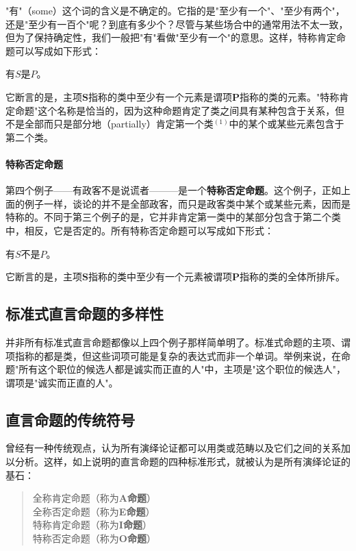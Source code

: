 "有"（some）这个词的含义是不确定的。它指的是"至少有一个"、"至少有两个"，还是"至少有一百个"呢？到底有多少个？尽管与某些场合中的通常用法不太一致，但为了保持确定性，我们一般把"有"看做"至少有一个"的意思。这样，特称肯定命题可以写成如下形式：

有$S$是$P$。

它断言的是，主项$\boldsymbol{S}$指称的类中至少有一个元素是谓项$\boldsymbol{P}$指称的类的元素。"特称肯定命题"这个名称是恰当的，因为这种命题肯定了类之间具有某种包含于关系，但不是全部而只是部分地（partially）肯定第一个类${ }^{(1)}$中的某个或某些元素包含于第二个类。

\paragraph{特称否定命题}
第四个例子——有政客不是说谎者———是一个\textbf{特称否定命题}。这个例子，正如上面的例子一样，谈论的并不是全部政客，而只是政客类中某个或某些元素，因而是特称的。不同于第三个例子的是，它并非肯定第一类中的某部分包含于第二个类中，相反，它是否定的。所有特称否定命题可以写成如下形式：

有$S$不是$P$。

它断言的是，主项$\boldsymbol{S}$指称的类中至少有一个元素被谓项$\boldsymbol{P}$指称的类的全体所排斥。

\subsection{标准式直言命题的多样性}

并非所有标准式直言命题都像以上四个例子那样简单明了。标准式命题的主项、谓项指称的都是类，但这些词项可能是复杂的表达式而非一个单词。举例来说，在命题"所有这个职位的候选人都是诚实而正直的人"中，主项是"这个职位的候选人"，谓项是"诚实而正直的人"。

\subsection{直言命题的传统符号}

曾经有一种传统观点，认为所有演绎论证都可以用类或范畴以及它们之间的关系加以分析。这样，如上说明的直言命题的四种标准形式，就被认为是所有演绎论证的基石：

\begin{quote}
全称肯定命题（称为\textbf{A命题}）\\
全称否定命题（称为\textbf{E命题}）\\
特称肯定命题（称为\textbf{I命题}）\\
特称否定命题（称为\textbf{O命题}）
\end{quote}

